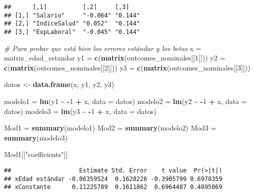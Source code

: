 \documentclass[
]{article}
\newenvironment{Shaded}{\begin{snugshade}}{\end{snugshade}}
\newcommand{\AttributeTok}[1]{\textcolor[rgb]{0.13,0.29,0.53}{#1}}
\newcommand{\CommentTok}[1]{\textcolor[rgb]{0.56,0.35,0.01}{\textit{#1}}}
\newcommand{\DecValTok}[1]{\textcolor[rgb]{0.00,0.00,0.81}{#1}}
\newcommand{\FunctionTok}[1]{\textcolor[rgb]{0.13,0.29,0.53}{\textbf{#1}}}
\newcommand{\NormalTok}[1]{#1}
\newcommand{\OtherTok}[1]{\textcolor[rgb]{0.56,0.35,0.01}{#1}}
\newcommand{\SpecialCharTok}[1]{\textcolor[rgb]{0.81,0.36,0.00}{\textbf{#1}}}
\newcommand{\StringTok}[1]{\textcolor[rgb]{0.31,0.60,0.02}{#1}}
\begin{document}
\begin{verbatim}
##      [,1]          [,2]     [,3]   
## [1,] "Salario"     "-0.064" "0.144"
## [2,] "IndiceSalud" "0.052"  "0.144"
## [3,] "ExpLaboral"  "-0.045" "0.144"
\end{verbatim}

\begin{Shaded}
\begin{Highlighting}[]
\CommentTok{\# Para probar que está bien los errores estándar y los betas}
\NormalTok{x }\OtherTok{=}\NormalTok{ matriz\_edad\_estandar}
\NormalTok{y1 }\OtherTok{=} \FunctionTok{c}\NormalTok{(}\FunctionTok{matrix}\NormalTok{(outcomes\_nominales[[}\DecValTok{1}\NormalTok{]]))}
\NormalTok{y2 }\OtherTok{=} \FunctionTok{c}\NormalTok{(}\FunctionTok{matrix}\NormalTok{(outcomes\_nominales[[}\DecValTok{2}\NormalTok{]]))}
\NormalTok{y3 }\OtherTok{=} \FunctionTok{c}\NormalTok{(}\FunctionTok{matrix}\NormalTok{(outcomes\_nominales[[}\DecValTok{3}\NormalTok{]]))}

\NormalTok{datos }\OtherTok{\textless{}{-}} \FunctionTok{data.frame}\NormalTok{(x, y1, y2, y3)}

\NormalTok{modelo1 }\OtherTok{=} \FunctionTok{lm}\NormalTok{(y1 }\SpecialCharTok{\textasciitilde{}} \SpecialCharTok{{-}}\DecValTok{1} \SpecialCharTok{+}\NormalTok{ x, }\AttributeTok{data =}\NormalTok{ datos)}
\NormalTok{modelo2 }\OtherTok{=} \FunctionTok{lm}\NormalTok{(y2 }\SpecialCharTok{\textasciitilde{}} \SpecialCharTok{{-}}\DecValTok{1} \SpecialCharTok{+}\NormalTok{ x, }\AttributeTok{data =}\NormalTok{ datos)}
\NormalTok{modelo3 }\OtherTok{=} \FunctionTok{lm}\NormalTok{(y3 }\SpecialCharTok{\textasciitilde{}} \SpecialCharTok{{-}}\DecValTok{1} \SpecialCharTok{+}\NormalTok{ x, }\AttributeTok{data =}\NormalTok{ datos)}

\NormalTok{Mod1 }\OtherTok{=} \FunctionTok{summary}\NormalTok{(modelo1)}
\NormalTok{Mod2 }\OtherTok{=} \FunctionTok{summary}\NormalTok{(modelo2)}
\NormalTok{Mod3 }\OtherTok{=} \FunctionTok{summary}\NormalTok{(modelo3)}

\NormalTok{Mod1[[}\StringTok{"coefficients"}\NormalTok{]]}
\end{Highlighting}
\end{Shaded}

\begin{verbatim}
##                   Estimate Std. Error    t value  Pr(>|t|)
## xEdad estándar -0.06359524  0.1628226 -0.3905799 0.6978359
## xConstante      0.11225789  0.1611862  0.6964487 0.4895069
\end{verbatim}
\end{document}
